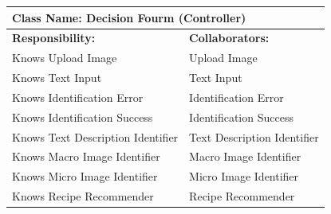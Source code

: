 \documentclass[]{article}
\begin{document}
\begin{itemize}
\begin{table}[ht]
\begin{tabular}{|p{6cm}|p{6cm}|}
		\end{tabular}
	\end{table}
	\begin{table}[ht]
		\centering
		\begin{tabular}{|p{6cm}|p{6cm}|}
		\hline 
		\multicolumn{2}{|l|}{\textbf{Class Name: Decision Fourm (Controller)}} \\
		\hline
		\textbf{Responsibility:} & \textbf{Collaborators:} \\
		\hline
		Knows Upload Image & Upload Image \\
		Knows Text Input & Text Input \\
		Knows Identification Error & Identification Error \\
		Knows Identification Success & Identification Success \\
		Knows Text Description Identifier &  Text Description Identifier \\
		Knows Macro Image Identifier & Macro Image Identifier \\
		Knows Micro Image Identifier & Micro Image Identifier \\
		Knows Recipe Recommender & Recipe Recommender \\


\end{tabular}
\end{table}
\end{itemize}
\end{document}
